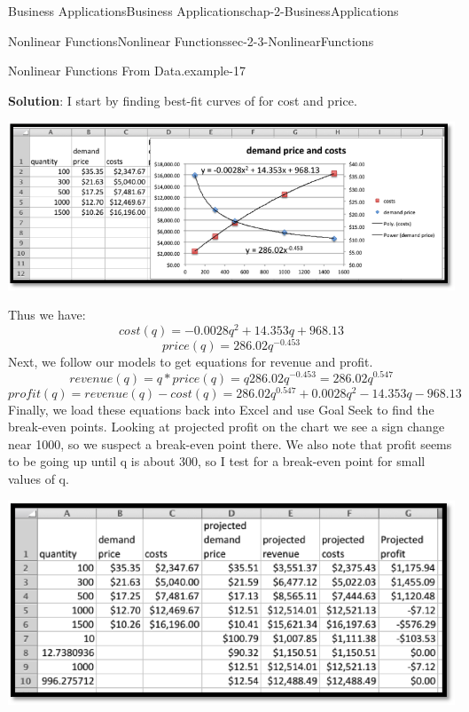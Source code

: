 \documentclass[oneside,10pt,]{book}
\newcommand{\terminology}[1]{\textbf{#1}}
\numberwithin{equation}{section}
\begin{document}
\begin{chapterptx}{Business Applications}{}{Business Applications}{}{}{chap-2-BusinessApplications}
\begin{sectionptx}{Nonlinear Functions}{}{Nonlinear Functions}{}{}{sec-2-3-NonlinearFunctions}
\begin{example}{Nonlinear Functions From Data.}{example-17}
\par
\hypertarget{p-776}{}%
\terminology{Solution}:  I start by finding best-fit curves of for cost and price.%
\begin{sidebyside}{1}{0.1}{0.1}{0}%
\begin{sbspanel}{0.8}%
\includegraphics[width=1\linewidth]{images/sec2-3-2.png}
\end{sbspanel}%
\end{sidebyside}%
\par
\hypertarget{p-777}{}%
Thus we have:%
%
\begin{equation*}
cost(q)=-0.0028q^2+14.353q+968.13
\end{equation*}
%
\begin{equation*}
price(q)=286.02 q^{-0.453}
\end{equation*}
\hypertarget{p-778}{}%
Next, we follow our models to get equations for revenue and profit.%
%
\begin{equation*}
revenue(q)=q*price(q)=q 286.02 q^{-0.453}=286.02 q^{0.547}
\end{equation*}
%
\begin{equation*}
profit(q)=revenue(q)-cost(q)=286.02 q^{0.547}+0.0028q^2-14.353q-968.13
\end{equation*}
\hypertarget{p-779}{}%
Finally, we load these equations back into Excel and use Goal Seek to find the break-even points.  Looking at projected profit on the chart we see a sign change near 1000, so we suspect a break-even point there.  We also note that profit seems to be going up until q is about 300, so I test for a break-even point for small values of q.%
\begin{sidebyside}{1}{0.1}{0.1}{0}%
\begin{sbspanel}{0.8}%
\includegraphics[width=1\linewidth]{images/sec2-3-3.png}

\end{sbspanel}
\end{sidebyside}
\end{example}
\end{sectionptx}
\end{chapterptx}
\end{document}
